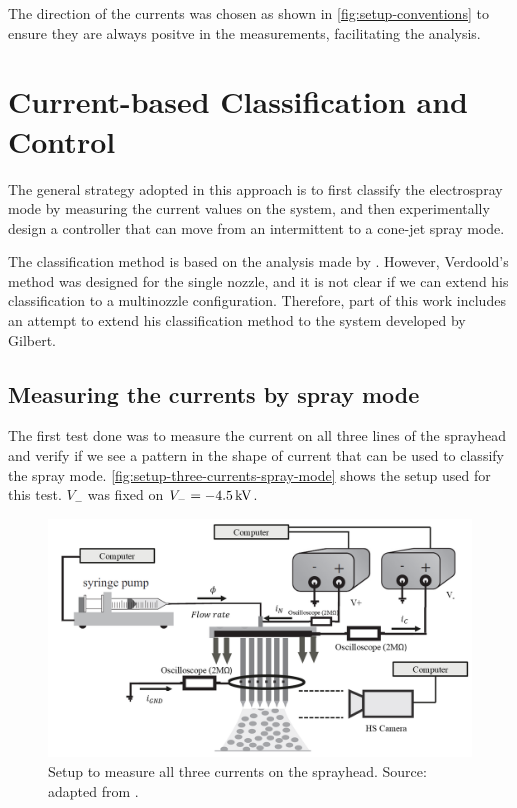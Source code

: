 \documentclass[oneside,12pt]{article}
\begin{document}
The direction of the currents was chosen as shown in \autoref{fig:setup-conventions} to ensure they are always positve 
in the measurements, facilitating the analysis.

\section{Current-based Classification and Control}\label{sec:current-based}

The general strategy adopted in this approach is to first classify the electrospray mode by measuring the current values 
on the system, and then experimentally design a controller that can move from an intermittent
to a cone-jet spray mode. 

The classification method is based on the analysis made by \cite{Verdoold2013}. However, Verdoold's method was designed for the 
single nozzle, and it is not clear if we can 
extend his classification to a multinozzle configuration. Therefore, part of this work 
includes an attempt to extend his classification method to the system developed by 
Gilbert.

\subsection{Measuring the currents by spray mode}

The first test done was to measure the current on all three lines of the sprayhead and 
verify if we see a pattern in the shape of current that can be used to classify the spray mode.
\autoref{fig:setup-three-currents-spray-mode} shows the setup used for this test. $V_-$ was fixed on 
$V_- = - 4.5 \,\mathrm{kV}$.

\begin{figure}[h!]
    \centering
    \includegraphics[width=\textwidth,trim=1 1 1 1,clip]{figures/setup-three-currents-spray-mode.png}
    \caption{Setup to measure all three currents on the sprayhead. Source: adapted from \cite{Verdoold2013}.}
    \label{fig:setup-three-currents-spray-mode}
\end{figure}
\end{document}
